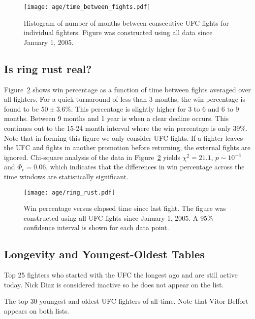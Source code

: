 \begin{figure}[h]
\begin{center}
\texttt{[image: age/time\_between\_fights.pdf]}
\caption{Histogram of number of months between consecutive UFC fights
for individual fighters. Figure was constructed using all data since
January 1, 2005.}
\label{time_between_fights}
\end{center}
\end{figure}

\subsection*{Is ring rust real?}
Figure~\ref{ring_rust} shows win percentage as a function
of time between fights averaged over all fighters.
For a quick turnaround of less than 3 months, the win percentage
is found to be $50\pm3.6\%$. This percentage is slightly
higher for 3 to 6 and 6 to 9 months.  Between 9 months
and 1 year is when a clear decline occurs. This continues
out to the 15-24 month interval where the win percentage
is only 39\%.
Note that in forming this figure we only consider UFC fights. If a fighter
leaves the UFC and fights in another promotion before returning, the
external fights are ignored. Chi-square analysis of the
data in Figure~\ref{ring_rust} yields
$\chi^2=21.1$, $p \sim 10^{-4}$ and $\Phi_c=0.06$, which
indicates that the differences in win percentage across the
time windows are statistically significant.

\begin{figure}[h]
\begin{center}
\texttt{[image: age/ring\_rust.pdf]}
\caption{Win percentage versus elapsed time since last fight. The figure
was constructed using all UFC fights since January 1, 2005. A
95\% confidence interval is shown for each data point.}
\label{ring_rust}
\end{center}
\end{figure}

\clearpage
\subsection*{Longevity and Youngest-Oldest Tables}

\begin{center}
\begin{table}[h]

\caption{Top 25 fighters who started with the UFC the longest ago and are still active today. Nick Diaz
is considered inactive so he does not appear on the list.}
\end{table}
\end{center}

\begin{center}
\begin{table}[h]

\caption{The top 30 youngest and oldest UFC fighters of all-time. Note that Vitor Belfort appears
on both lists.}
\end{table}
\end{center}
